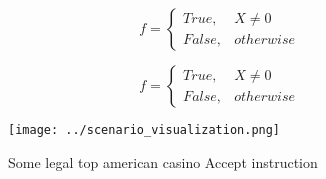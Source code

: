 \documentclass[a4paper]{article}
\begin{document}
\begin{equation}   f =
\begin{cases} True, & X \neq 0\\
False, & otherwise
\end{cases}
\end{equation}

\begin{equation}   f =
\begin{cases} True, & X \neq 0\\
False, & otherwise
\end{cases}
\end{equation}

\begin{figure}
\centering
\texttt{[image: ../scenario\_visualization.png]}
\caption{Some legal top american casino Accept instruction
}
\end{figure}
 
\end{document}
